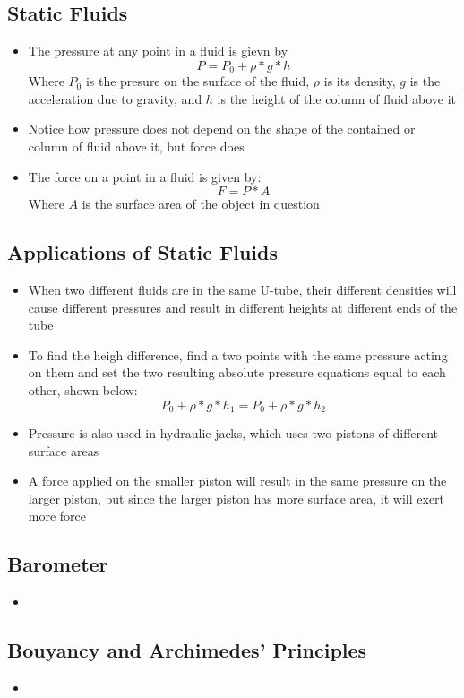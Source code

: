 \subsection{Static Fluids}
\begin{itemize}
    \item The pressure at any point in a fluid is gievn by \[P=P_0+\rho*g*h\] Where \(P_0\) is the presure on the surface of the fluid, \(\rho\) is its density, \(g\) is the acceleration due to gravity, and \(h\) is the height of the column of fluid above it
    \item Notice how pressure does not depend on the shape of the contained or column of fluid above it, but force does
    \item The force on a point in a fluid is given by: \[F=P*A\] Where  \(A\) is the surface area of the object in question 
\end{itemize}

\subsection{Applications of Static Fluids}
\begin{itemize}
    \item When two different fluids are in the same U-tube, their different densities will cause different pressures and result in different heights at different ends of the tube
    \item To find the heigh difference, find a two points with the same pressure acting on them and set the two resulting absolute pressure equations equal to each other, shown below: 
    \[P_0+\rho*g*h_{1}=P_0+\rho*g*h_{2}\]
    \item Pressure is also used in hydraulic jacks, which uses two pistons of different surface areas
    \item A force applied on the smaller piston will result in the same pressure on the larger piston, but since the larger piston has more surface area, it will exert more force 
\end{itemize}

\subsection{Barometer}
\begin{itemize}
    \item 
\end{itemize}

\subsection{Bouyancy and Archimedes' Principles}
\begin{itemize}
    \item 
\end{itemize}

